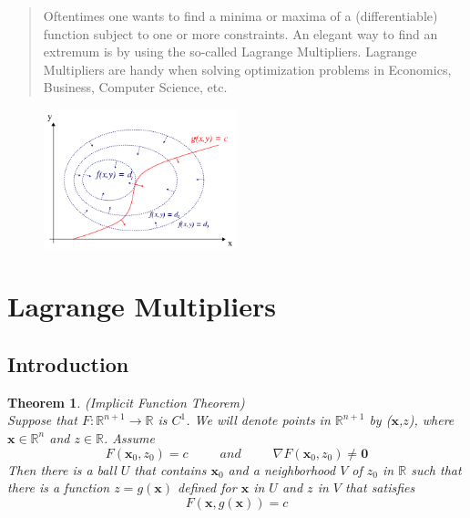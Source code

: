 \documentclass[]{article}
\newtheorem{theorem}{Theorem}
\begin{document}
 
\maketitle
\begin{abstract}
    Oftentimes one wants to find a minima or maxima of a (differentiable) function subject to one or more constraints. An elegant way to find an extremum is by using the so-called Lagrange Multipliers. Lagrange Multipliers are handy when solving optimization problems in Economics, Business, Computer Science, etc. 
\end{abstract}
\begin{figure}[h]
    \centering
    \includegraphics[width=0.50\textwidth]{abstract_img.png}
\end{figure}


\newpage
\tableofcontents
\newpage

\section{Lagrange Multipliers}
\subsection{Introduction}

\begin{theorem}(Implicit Function Theorem) \\
    Suppose that $F:\mathbb{R}^{n+1}\to \mathbb{R}$ is $C^{1}$. We will denote points in $\mathbb{R}^{n+1}$ 
    by ($\pmb{x}$,$z$), where $\pmb{x}\in \mathbb{R}^n$ and $z\in \mathbb{R}$. Assume \\
    $$
        F(\pmb{x}_{0},z_{0})=c \hspace{30pt} and \hspace{30pt} \nabla F(\pmb{x}_{0},z_{0})\neq \pmb{0}
    $$
    Then there is a ball $U$ that contains $\pmb{x}_{0}$ and a neighborhood $V$ of $z_{0}$ in $\mathbb{R}$ such that there is a function $z=g(\pmb{x})$ defined for $\pmb{x}$ in $U$ and $z$ in $V$ that satisfies
    $$
        F(\pmb{x},g(\pmb{x}))=c
    $$
    
\end{theorem}
\end{document}
